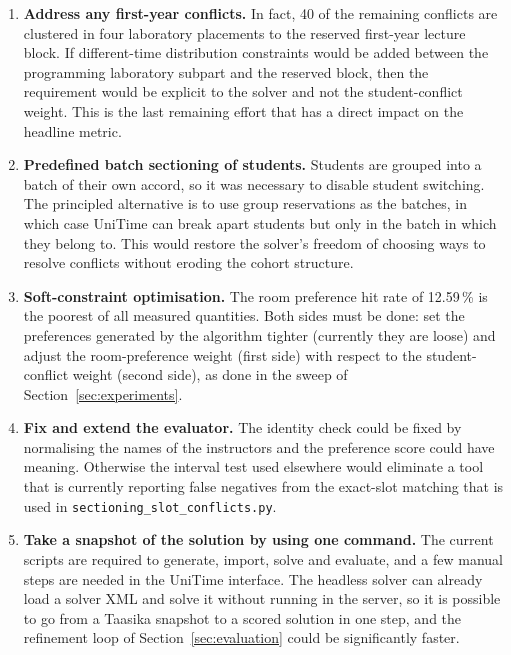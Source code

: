 \begin{enumerate}
  \item \textbf{Address any first-year conflicts.} In fact, 40 of the remaining conflicts are
    clustered in four laboratory placements to the reserved first-year lecture block. If
    different-time distribution constraints would be added between the programming laboratory
    subpart and the reserved block, then the requirement would be explicit to the solver and not the
    student-conflict weight. This is the last remaining effort that has a direct impact on the
    headline metric.

  \item \textbf{Predefined batch sectioning of students.} Students are grouped into a batch of
    their own accord, so it was necessary to disable student switching. The principled alternative
    is to use group reservations as the batches, in which case UniTime can break apart students
    but only in the batch in which they belong to. This would restore the solver's freedom of
    choosing ways to resolve conflicts without eroding the cohort structure.

  \item \textbf{Soft-constraint optimisation.} The room preference hit rate of 12.59\,\% is the
    poorest of all measured quantities. Both sides must be done: set the preferences generated by
    the algorithm tighter (currently they are loose) and adjust the room-preference weight (first
    side) with respect to the student-conflict weight (second side), as done in the sweep of
    Section~\ref{sec:experiments}.

  \item \textbf{Fix and extend the evaluator.} The identity check could be fixed by normalising
    the names of the instructors and the preference score could have meaning. Otherwise the
    interval test used elsewhere would eliminate a tool that is currently reporting false
    negatives from the exact-slot matching that is used in
    \texttt{sectioning\_slot\_conflicts.py}.

  \item \textbf{Take a snapshot of the solution by using one command.} The current scripts are
    required to generate, import, solve and evaluate, and a few manual steps are needed in the
    UniTime interface. The headless solver can already load a solver XML and solve it without
    running in the server, so it is possible to go from a Taasika snapshot to a scored solution
    in one step, and the refinement loop of Section~\ref{sec:evaluation} could be significantly
    faster.


\end{enumerate}
